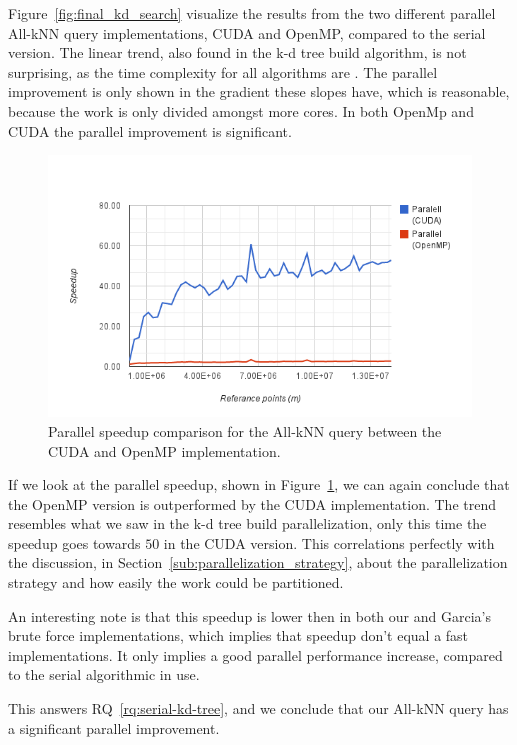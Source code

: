 Figure~\ref{fig:final_kd_search} visualize the results from the two different parallel All-kNN query implementations, CUDA and OpenMP, compared to the serial version. The linear trend, also found in the k-d tree build algorithm, is not surprising, as the time complexity for all algorithms are . The parallel improvement is only shown in the gradient these slopes have, which is reasonable, because the work is only divided amongst more cores. In both OpenMp and CUDA the parallel improvement is significant.

\begin{figure}[ht!]
    \centering
    \includegraphics[width=120mm]{../gfx/final_kd_search_speedup.png}
    \caption{Parallel speedup comparison for the All-kNN query between the CUDA and OpenMP implementation.}
    \label{fig:final_kd_search_speedup}
\end{figure}

If we look at the parallel speedup, shown in Figure~\ref{fig:final_kd_search_speedup}, we can again conclude that the OpenMP version is outperformed by the CUDA implementation. The trend resembles what we saw in the k-d tree build parallelization, only this time the speedup goes towards $50$ in the CUDA version. This correlations perfectly with the discussion, in Section~\ref{sub:parallelization_strategy}, about the parallelization strategy and how easily the work could be partitioned.      

An interesting note is that this speedup is lower then in both our and Garcia's\cite{Garcia2008} brute force implementations, which implies that speedup don't equal a fast implementations. It only implies a good parallel performance increase, compared to the serial algorithmic in use.

This answers RQ~\ref{rq:serial-kd-tree}, and we conclude that our All-kNN query has a significant parallel improvement.

